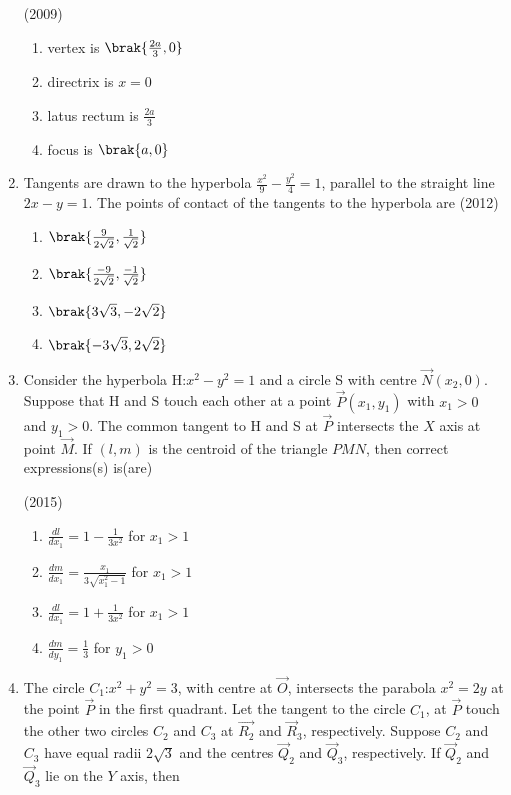 \begin{enumerate}[label=\thesubsection.\arabic*.,ref=\thesubsection.\theenumi]
		\hfill(2009)
		\begin{multicols}{2}
\begin{enumerate}
			\item vertex is $\brak{\frac{2a}{3},0}$
			\item directrix is $x=0$
				\columnbreak
			\item latus rectum is $\frac{2a}{3}$
			\item focus is $\brak{a,0}$
		\end{enumerate}
\end{multicols}
	\item Tangents are drawn to the hyperbola $\frac{x^2}{9}-\frac{y^2}{4}=1$, parallel to the straight line $2x-y=1$. The points of contact of the tangents to the hyperbola
		are  
		\hfill(2012)
		
		 \begin{multicols}{4}
\begin{enumerate}
			\item $\brak{\frac{9}{2\sqrt{2}},\frac{1}{\sqrt{2}}}$ 
			\item $ \brak{\frac{-9}{2\sqrt{2}},\frac{-1}{\sqrt{2}}}$
			\item $\brak{3\sqrt{3},-2\sqrt{2}}$
			\item $ \brak{-3\sqrt{3},2\sqrt{2}}$
		
		 \end{enumerate}
\end{multicols}
	\item Consider the hyperbola H:$x^2-y^2=1$ and a circle S with 
		centre $\vec{N}(x_2,0)$. Suppose that H and S touch each other at a 
	      point $\vec{P}(x_1,y_1)$ with $x_1>0$ and $y_1>0$. The common tangent to H and S at $\vec{P}$ intersects the $X$ axis at point $\vec{M}$. If $(l,m)$ is the centroid of the triangle $PMN$, then correct expressions(s) is(are)
	      
	      \hfill(2015)
	      
	       \begin{multicols}{2}
\begin{enumerate}
		      \item $\frac{dl}{dx_1}=1-\frac{1}{3x^2}$ for $x_1>1$ 
		      \item $\frac{dm}{dx_1}=\frac{x_1}{3\sqrt{x_1^2-1}}$ for $x_1>1$ 
		      \item $\frac{dl}{dx_1}=1+\frac{1}{3x^2}$ for $x_1>1$
		      \item $\frac{dm}{dy_1}=\frac{1}{3}$ for $y_1>0$ 
	       \end{enumerate}
\end{multicols}
      \item The circle $C_1$:$x^2+y^2=3$, with centre at $\vec{O}$, intersects the parabola $x^2=2y$ at the point $\vec{P}$ in the first quadrant. Let the tangent to the circle $C_1$, at $\vec{P}$ touch the other two circles $C_2$ and $C_3$ at $\vec{R_2}$ and $\vec{R}_3$, respectively. Suppose $C_2$ and $C_3$ have equal radii $2\sqrt{3}$ and the centres $\vec{Q}_2$ and $\vec{Q}_3$, respectively. If $\vec{Q}_2$ and $\vec{Q}_3$ lie on the $Y$ axis, then 


\end{enumerate}
